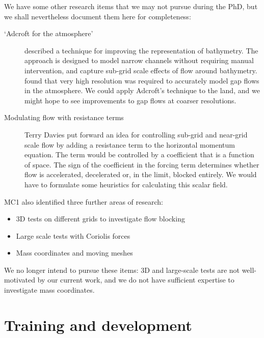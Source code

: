 \documentclass[a4paper]{article}
\begin{document}
We have some other research items that we may not pursue during the PhD, but we shall nevertheless document them here for completeness:
\begin{description}
	\item[`Adcroft for the atmosphere']{\citet{adcroft2013} described a technique for improving the representation of bathymetry.  The approach is designed to model narrow channels without requiring manual intervention, and capture sub-grid scale effects of flow around bathymetry.  \citet{gohm2004} found that very high resolution was required to accurately model gap flows in the atmosphere.  We could apply Adcroft's technique to the land, and we might hope to see improvements to gap flows at coarser resolutions.}
	\item[Modulating flow with resistance terms]{Terry Davies put forward an idea for controlling sub-grid and near-grid scale flow by adding a resistance term to the horizontal momentum equation.  The term would be controlled by a coefficient that is a function of space.  The sign of the coefficient in the forcing term determines whether flow is accelerated, decelerated or, in the limit, blocked entirely.  We would have to formulate some heuristics for calculating this scalar field.}
\end{description}

MC1 also identified three further areas of research:
\begin{itemize}
	\item 3D tests on different grids to investigate flow blocking
	\item Large scale tests with Coriolis forces
	\item Mass coordinates and moving meshes
\end{itemize}
We no longer intend to pursue these items: 3D and large-scale tests are not well-motivated by our current work, and we do not have sufficient expertise to investigate mass coordinates.

\section{Training and development}
\end{document}
